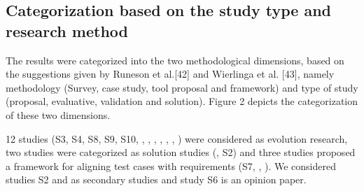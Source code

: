 \documentclass{article}
\begin{document}

\subsection{Categorization based on the study type and research method}\label{ResultsCat}

The results were categorized into the two methodological dimensions, based on the suggestions given by Runeson et al.[42] and Wierlinga et al. [43], namely methodology (Survey, case study, tool proposal and framework) and type of study (proposal, evaluative, validation and solution). Figure 2 depicts the categorization of these two dimensions. 

12 studies (S3, S4, S8, S9, S10, \cite{lobo2005local}, \cite{aichernig2014integration}, \cite{ferguson2006empirical}, \cite{bjarnason2014alignment}, \cite{melnik2006executable}, \cite{bjarnason2013distances}, \cite{melnik2004suitability}) were considered as evolution research, two studies were categorized as solution studies (\cite{ricca2007talking}, S2) and three studies proposed a framework for aligning test cases with requirements (S7, \cite{metsa2007testing}, \cite{bjarnason2015industrial}). We considered studies S2 and \cite{ferguson2006empirical} as secondary studies and study S6 is an opinion paper.  
 
\end{document}
